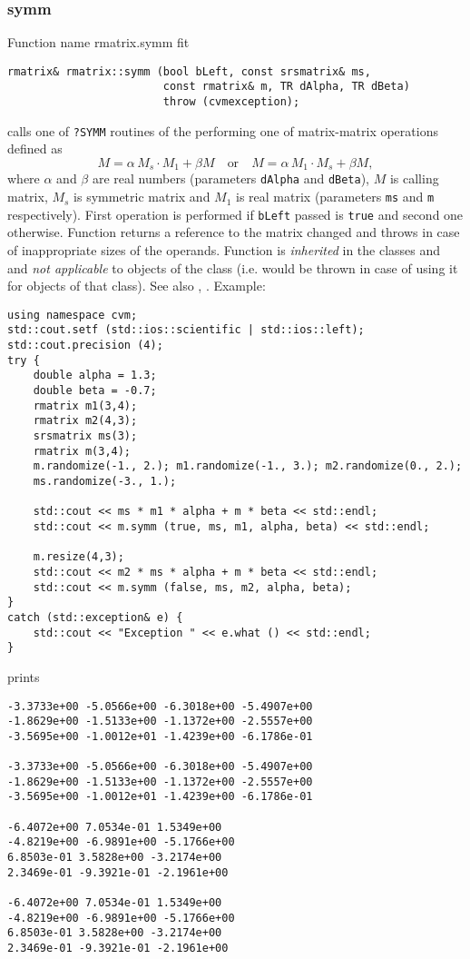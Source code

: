 \subsubsection{symm}
Function%
\pdfdest name {rmatrix.symm} fit
\begin{verbatim}
rmatrix& rmatrix::symm (bool bLeft, const srsmatrix& ms,
                        const rmatrix& m, TR dAlpha, TR dBeta)
                        throw (cvmexception);
\end{verbatim}
calls one of \verb"?SYMM" routines of the
performing one of
matrix-matrix operations defined as
\begin{equation*}
M=\alpha\,M_s\cdot M_1 + \beta M\quad\text{or}\quad M=\alpha\,M_1\cdot M_s + \beta M,
\end{equation*}
where $\alpha$ and $\beta$ are real numbers
(parameters \verb"dAlpha" and \verb"dBeta"),
$M$ is  calling matrix,
$M_s$ is  symmetric matrix and $M_1$
is  real matrix (parameters \verb"ms"
and \verb"m" respectively).
First operation is performed if \verb"bLeft" passed
is \verb"true" and second one otherwise.
Function
returns a reference to the matrix changed and throws
in case of inappropriate sizes of the operands.
Function is \emph{inherited} in the classes
 and
 and
\emph{not applicable} to objects of the class
 (i.e.  would be thrown
in case of using it for objects of that class).
See also ,
.
Example:
\begin{Verbatim}
using namespace cvm;
std::cout.setf (std::ios::scientific | std::ios::left);
std::cout.precision (4);
try {
    double alpha = 1.3;
    double beta = -0.7;
    rmatrix m1(3,4);
    rmatrix m2(4,3);
    srsmatrix ms(3);
    rmatrix m(3,4);
    m.randomize(-1., 2.); m1.randomize(-1., 3.); m2.randomize(0., 2.);
    ms.randomize(-3., 1.);

    std::cout << ms * m1 * alpha + m * beta << std::endl;
    std::cout << m.symm (true, ms, m1, alpha, beta) << std::endl;

    m.resize(4,3);
    std::cout << m2 * ms * alpha + m * beta << std::endl;
    std::cout << m.symm (false, ms, m2, alpha, beta);
}
catch (std::exception& e) {
    std::cout << "Exception " << e.what () << std::endl;
}
\end{Verbatim}
prints
\begin{Verbatim}
-3.3733e+00 -5.0566e+00 -6.3018e+00 -5.4907e+00
-1.8629e+00 -1.5133e+00 -1.1372e+00 -2.5557e+00
-3.5695e+00 -1.0012e+01 -1.4239e+00 -6.1786e-01

-3.3733e+00 -5.0566e+00 -6.3018e+00 -5.4907e+00
-1.8629e+00 -1.5133e+00 -1.1372e+00 -2.5557e+00
-3.5695e+00 -1.0012e+01 -1.4239e+00 -6.1786e-01

-6.4072e+00 7.0534e-01 1.5349e+00
-4.8219e+00 -6.9891e+00 -5.1766e+00
6.8503e-01 3.5828e+00 -3.2174e+00
2.3469e-01 -9.3921e-01 -2.1961e+00

-6.4072e+00 7.0534e-01 1.5349e+00
-4.8219e+00 -6.9891e+00 -5.1766e+00
6.8503e-01 3.5828e+00 -3.2174e+00
2.3469e-01 -9.3921e-01 -2.1961e+00
\end{Verbatim}
